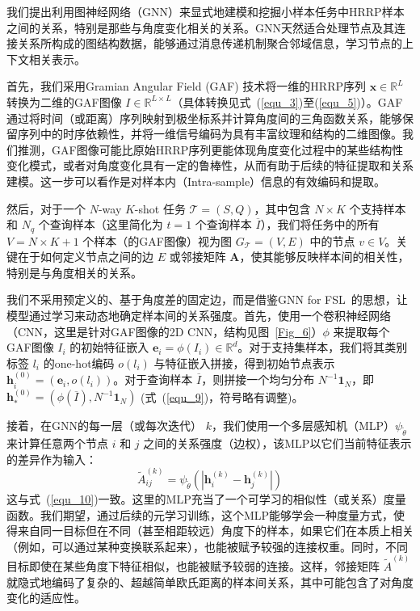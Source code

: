 我们提出利用图神经网络（GNN）来显式地建模和挖掘小样本任务中HRRP样本之间的关系，特别是那些与角度变化相关的关系。GNN天然适合处理节点及其连接关系所构成的图结构数据，能够通过消息传递机制聚合邻域信息，学习节点的上下文相关表示。

首先，我们采用Gramian Angular Field (GAF) 技术将一维的HRRP序列 $\mathbf{x} \in \mathbb{R}^L$ 转换为二维的GAF图像 $I \in \mathbb{R}^{L \times L}$（具体转换见式~(\ref{equ_3})至(\ref{equ_5})）。GAF通过将时间（或距离）序列映射到极坐标系并计算角度间的三角函数关系，能够保留序列中的时序依赖性，并将一维信号编码为具有丰富纹理和结构的二维图像。我们推测，GAF图像可能比原始HRRP序列更能体现角度变化过程中的某些结构性变化模式，或者对角度变化具有一定的鲁棒性，从而有助于后续的特征提取和关系建模。这一步可以看作是对样本内（Intra-sample）信息的有效编码和提取。

然后，对于一个 $N$-way $K$-shot 任务 $\mathcal{T} = (S, Q)$，其中包含 $N \times K$ 个支持样本和 $N_q$ 个查询样本（这里简化为 $t=1$ 个查询样本 $\overline{I}$），我们将任务中的所有 $V = N \times K + 1$ 个样本（的GAF图像）视为图 $G_{\mathcal{T}} = (V, E)$ 中的节点 $v \in V$。关键在于如何定义节点之间的边 $E$ 或邻接矩阵 $\mathbf{A}$，使其能够反映样本间的相关性，特别是与角度相关的关系。

我们不采用预定义的、基于角度差的固定边，而是借鉴GNN for FSL~\cite{ref42}的思想，让模型通过学习来动态地确定样本间的关系强度。首先，使用一个卷积神经网络（CNN，这里是针对GAF图像的2D CNN，结构见图~\ref{Fig_6}）$\phi$ 来提取每个GAF图像 $I_i$ 的初始特征嵌入 $\mathbf{e}_i = \phi(I_i) \in \mathbb{R}^d$。对于支持集样本，我们将其类别标签 $l_i$ 的one-hot编码 $o(l_i)$ 与特征嵌入拼接，得到初始节点表示 $\mathbf{h}_i^{(0)} = (\mathbf{e}_i, o(l_i))$。对于查询样本 $\overline{I}$，则拼接一个均匀分布 $N^{-1}\mathbf{1}_N$，即 $\mathbf{h}_*^{(0)} = (\phi(\overline{I}), N^{-1}\mathbf{1}_N)$ (式~(\ref{equ_9})，符号略有调整)。

接着，在GNN的每一层（或每次迭代） $k$，我们使用一个多层感知机（MLP）$\psi_{\tilde{\theta}}$ 来计算任意两个节点 $i$ 和 $j$ 之间的关系强度（边权），该MLP以它们当前特征表示的差异作为输入：
\begin{equation}
    \tilde{A}_{ij}^{(k)} = \psi_{\tilde{\theta}}(|\mathbf{h}_i^{(k)} - \mathbf{h}_j^{(k)}|)
    \label{eq:edge_weight_mlp}
\end{equation}
这与式~(\ref{equ_10})一致。这里的MLP充当了一个可学习的相似性（或关系）度量函数。我们期望，通过后续的元学习训练，这个MLP能够学会一种度量方式，使得来自同一目标但在不同（甚至相距较远）角度下的样本，如果它们在本质上相关（例如，可以通过某种变换联系起来），也能被赋予较强的连接权重。同时，不同目标即使在某些角度下特征相似，也能被赋予较弱的连接。这样，邻接矩阵 $\tilde{A}^{(k)}$ 就隐式地编码了复杂的、超越简单欧氏距离的样本间关系，其中可能包含了对角度变化的适应性。

